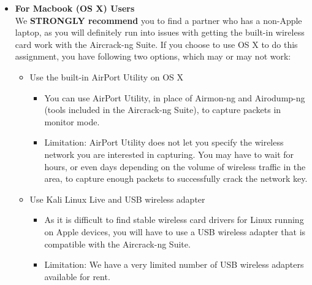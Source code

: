 \begin{itemize}
  \item \textbf{For Macbook (OS X) Users}\\
  We \textbf{STRONGLY recommend} you to find a partner who has a non-Apple laptop, as you will definitely run into issues with getting the built-in wireless card work with the Aircrack-ng Suite.
  If you choose to use OS X to do this assignment, you have following two options, which may or may not work:
  \begin{itemize}[nosep]
    \item Use the built-in AirPort Utility on OS X
      \begin{itemize}[nosep]
        \item You can use AirPort Utility, in place of Airmon-ng and Airodump-ng (tools included in the Aircrack-ng Suite), to capture packets in monitor mode.
        \item Limitation: AirPort Utility does not let you specify the wireless network you are interested in capturing. You may have to wait for hours, or even days depending on the volume of wireless traffic in the area, to capture enough packets to successfully crack the network key.
      \end{itemize}
    \item Use Kali Linux Live and USB wireless adapter
      \begin{itemize}[nosep]
        \item As it is difficult to find stable wireless card drivers for Linux running on Apple devices, you will have to use a USB wireless adapter that is compatible with the Aircrack-ng Suite.
        \item Limitation: We have a very limited number of USB wireless adapters available for rent.
      \end{itemize}
  \end{itemize}

\pagebreak


\end{itemize}
